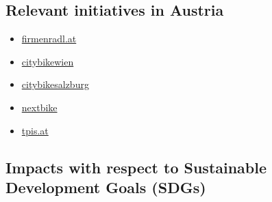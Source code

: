 \documentclass[
]{book}
\providecommand{\tightlist}{%
  \setlength{\itemsep}{0pt}\setlength{\parskip}{0pt}}
\begin{document}
\hypertarget{relevant-initiatives-in-austria-43}{%
\subsection*{Relevant initiatives in Austria}\label{relevant-initiatives-in-austria-43}}

\begin{itemize}
\tightlist
\item
  \href{https://firmenradl.at/cms/}{firmenradl.at}
\item
  \href{https://www.citybikewien.at/de}{citybikewien}
\item
  \href{http://www.citybikesalzburg.at/}{citybikesalzburg}
\item
  \href{https://www.nextbike.at/de/niederoesterreich/}{nextbike}
\item
  \href{https://www.tips.at/nachrichten/linz/land-leute/523512-linzer-radverleih-startet-im-fruehjahr-an-40-standorten}{tpis.at}
\end{itemize}

\hypertarget{impacts-with-respect-to-sustainable-development-goals-sdgs-43}{%
\subsection*{Impacts with respect to Sustainable Development Goals (SDGs)}\label{impacts-with-respect-to-sustainable-development-goals-sdgs-43}}
\end{document}
